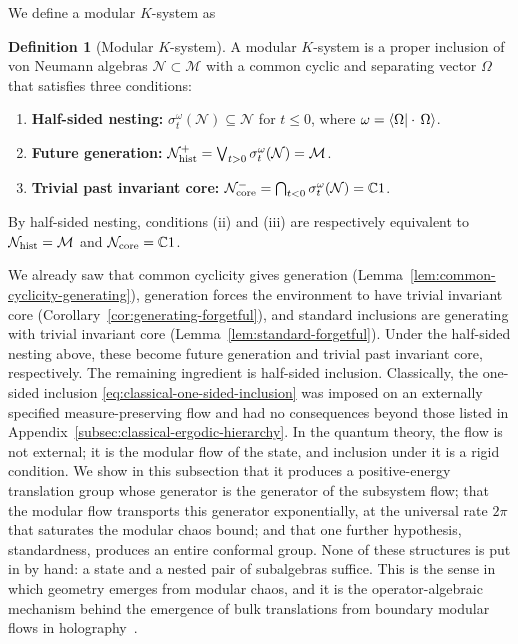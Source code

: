 \documentclass[a4paper,11pt]{article}
\theoremstyle{definition}
\newtheorem{definition}{Definition}[section]
\newcommand{\mN}{\mathcal{N}}
\newcommand{\mM}{\mathcal{M}}
\begin{document}
We define a modular $K$-system as
\begin{definition}[Modular $K$-system]
\label{def:quantum-K-system}
A modular $K$-system is a proper inclusion of von Neumann algebras $\mN \subset \mM$ with a common cyclic and separating vector $\Omega$ that satisfies three conditions:
\begin{enumerate}
    \item \textbf{Half-sided nesting:} $\sigma^\omega_t(\mN) \subseteq \mN$ for $t \le 0$, where $\omega = \braket{\Omega | \cdot \, \Omega}$.
    \item \textbf{Future generation:} $\mN_{\rm hist}^{+}=\bigvee_{t>0}\sigma^\omega_t(\mN)=\mM$.
    \item \textbf{Trivial past invariant core:} $\mN_{\rm core}^{-}=\bigcap_{t<0}\sigma^\omega_t(\mN)=\mathbb C1$.
\end{enumerate}
By half-sided nesting, conditions (ii) and (iii) are respectively equivalent to $\mN_{\rm hist}=\mM$ and $\mN_{\rm core}=\mathbb C1$.
\end{definition}



We already saw that common cyclicity gives generation (Lemma~\ref{lem:common-cyclicity-generating}), generation forces the environment to have trivial invariant core (Corollary~\ref{cor:generating-forgetful}), and standard inclusions are generating with trivial invariant core (Lemma~\ref{lem:standard-forgetful}). Under the half-sided nesting above, these become future generation and trivial past invariant core, respectively. The remaining ingredient is half-sided inclusion. Classically, the one-sided inclusion \eqref{eq:classical-one-sided-inclusion} was imposed on an externally specified measure-preserving flow and had no consequences beyond those listed in Appendix~\ref{subsec:classical-ergodic-hierarchy}. In the quantum theory, the flow is not external; it is the modular flow of the state, and inclusion under it is a rigid condition. We show in this subsection that it produces a positive-energy translation group whose generator is the generator of the subsystem flow; that the modular flow transports this generator exponentially, at the universal rate $2\pi$ that saturates the modular chaos bound; and that one further hypothesis, standardness, produces an entire conformal group. None of these structures is put in by hand: a state and a nested pair of subalgebras suffice. This is the sense in which geometry emerges from modular chaos, and it is the operator-algebraic mechanism behind the emergence of bulk translations from boundary modular flows in holography~\cite{deBoerLamprou2020,LeutheusserLiu2023}.
\end{document}
